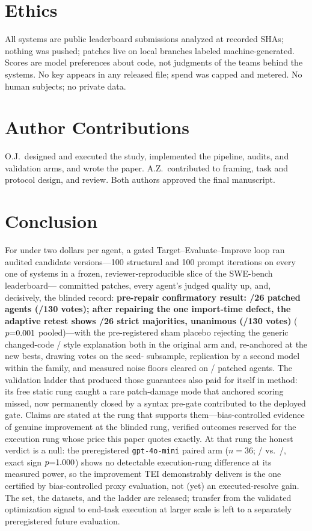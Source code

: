 \documentclass[11pt]{article}
\begin{document}
\section{Ethics}
\label{sec:ethics}
All systems are public leaderboard submissions analyzed at recorded SHAs;
nothing was pushed; patches live on local branches labeled machine-generated.
Scores are model preferences about code, not judgments of the teams behind
the systems. No key appears in any released file; spend was capped and
metered. No human subjects; no private data.

\section*{Author Contributions}
O.J.\ designed and executed the study, implemented the pipeline, audits, and
validation arms, and wrote the paper. A.Z.\ contributed to framing, task and
protocol design, and review. Both authors approved the final manuscript.

\section{Conclusion}
\label{sec:conclusion}
For under two dollars per agent, a gated Target--Evaluate--Improve loop ran
\swVersions{} audited candidate versions---100 structural and 100 prompt
iterations on every one of \swN{} systems in a frozen,
reviewer-reproducible slice of the SWE-bench
leaderboard---\swApplied{} committed patches, every agent's judged
quality up, and, decisively, the blinded record: \textbf{pre-repair
confirmatory result: \swBlindPreMajP/26 patched agents
(\swBlindPreVotesP/130 votes); after repairing the one import-time defect,
the adaptive retest shows \swBlindMajP/26 strict majorities,
\swBlindPerfect{} unanimous (\swBlindVotesP/130 votes)}
($p{=}0.001$ pooled)---with the pre-registered sham placebo rejecting the
generic changed-code / style explanation both in the original arm and,
re-anchored at the new bests, drawing \swShamReVotes{} votes on the
seed-\swShamReSeed{} subsample, replication by
a second model within the family, and measured noise floors cleared on \swExceedFloorP/\swBlindAgents{}
patched agents\MDEconc. The validation ladder that produced those guarantees also
paid for itself in method: its free static rung caught a rare patch-damage
mode that anchored scoring missed, now permanently closed by a syntax pre-gate
contributed to the deployed gate. Claims are stated at the rung that
supports them---bias-controlled evidence of genuine improvement at the
blinded rung, verified outcomes reserved for the execution rung whose price
this paper quotes exactly. At that rung the honest verdict is a null: the
preregistered \texttt{gpt-4o-mini} paired arm ($n{=}36$;
\swExecPatch/\swExecN{} vs.\ \swExecBase/\swExecN, exact sign
$p{=}1.000$) shows no detectable execution-rung difference at its
measured power, so the improvement TEI demonstrably delivers is the one
certified by bias-controlled proxy evaluation, not (yet) an executed-resolve
gain. The set, the datasets, and the ladder are released; transfer from the
validated optimization signal to end-task execution at larger scale is left to
a separately preregistered future evaluation.
\end{document}
